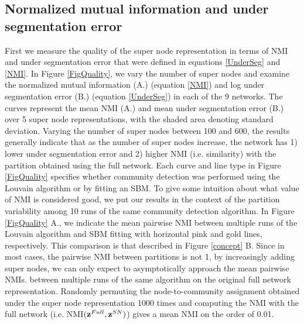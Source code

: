 \subsection{Normalized mutual information and under segmentation error}
First we measure the quality of the super node representation in terms of NMI and under segmentation error that were defined in equations \ref{UnderSeg} and \ref{NMI}. In Figure \ref{FigQuality},  we vary the number of super nodes  and examine the normalized mutual information (A.) (equation \ref{NMI}) and log under segmentation error (B.) (equation \ref{UnderSeg}) in each of the 9 networks. The curves represent the mean NMI (A.) and mean under segmentation error (B.) over 5 super node representations, with the shaded area denoting standard deviation. Varying the number of super nodes between 100 and 600, the results generally indicate that as the number of super nodes increase, the network has 1) lower under segmentation error and 2) higher NMI (i.e. similarity) with the partition obtained using the full network. Each curve and line type in Figure \ref{FigQuality}  specifies whether community detection was performed using the Louvain algorithm or by fitting an SBM. To give some intuition about what value of NMI is considered good, we put our results in the context of the partition variability among 10 runs of the same community detection algorithm. In Figure \ref{FigQuality} A., we indicate the mean pairwise NMI between multiple runs of the Louvain algorithm and SBM fitting with horizontal pink and gold lines, respectively. This comparison is that described in Figure \ref{concept} B. Since in most cases, the pairwise NMI between partitions is not 1, by increasingly adding super nodes, we can only expect to asymptotically approach the mean pairwise NMIs. between multiple runs of the same algorithm on the original full network representation. Randomly permuting the node-to-community assignment obtained under the super node representation 1000 times and computing the NMI with the full network (i.e. NMI$({\bf z}^{Full},{\bf z}^{SN})$) gives a mean NMI on the order of 0.01. 
